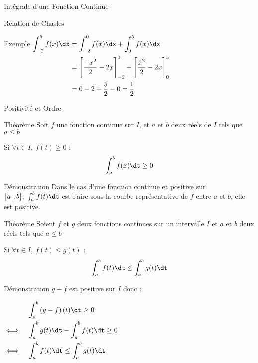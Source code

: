 \documentclass{cours}
\begin{document}
\begin{Gpartie}{Intégrale d'une Fonction Continue}
\begin{Spartie}{Relation de Chasles}
\begin{SSpartie}{Exemple}
                $\begin{aligned}[t]
                    \int_{-2}^5f(x)\dx &= \int_{-2}^0f(x)\dx+\int_0^5f(x)\dx \\
                    &= \Bigg[\frac{-x^2}{2}-2x\Bigg]_{-2}^0+\Bigg[\frac{x^2}{2}-2x\Bigg]_0^5 \\
                    &= 0-2+\frac{5}{2}-0=\frac{1}{2} 
                \end{aligned}$
            \end{SSpartie}
        \end{Spartie}
        \pagebreak
        \begin{Spartie}{Positivité et Ordre} 
            \begin{SSpartie}{Théorème} 
                Soit $f$ une fonction continue sur $I$, et $a$ et $b$ deux réels de $I$ tels que $a\leq b$

                Si $\forall t\in I,~f(t)\geq0$ : \[\int_a^b f(x)\dt\geq0\]
                \begin{SSSpartie}{Démonstration} 
                    Dans le cas d'une fonction continue et positive sur $\big[a~;b\big],~\int_a^b f(t)\dt$ est l'aire sous la courbe représentative de $f$ entre $a$ et $b$, elle est positive.
                \end{SSSpartie}
            \end{SSpartie}
            \begin{SSpartie}{Théorème} 
                Soient $f$ et $g$ deux fonctions continues sur un intervalle $I$ et $a$ et $b$ deux réels tels que $a\leq b$

                Si $\forall t\in I,~f(t)\leq g(t)$ : \[\int_a^b f(t)\dt\leq\int_a^bg(t)\dt\]
                \begin{SSSpartie}{Démonstration} 
                    $g-f$ est positive sur $I$ donc : 

                    $\begin{aligned}[t]
                        &\quad\int_a^b\left(g-f\right)(t)\dt\geq 0 \\
                        \iff&\quad\int_a^b g(t)\dt-\int_a^b f(t)\dt\geq 0 \\
                        \iff&\quad\int_a^b f(t)\dt\leq\int_a^b g(t)\dt
                    \end{aligned}$
                \end{SSSpartie}
            \end{SSpartie}
        \end{Spartie}
    \end{Gpartie}
\end{document}
